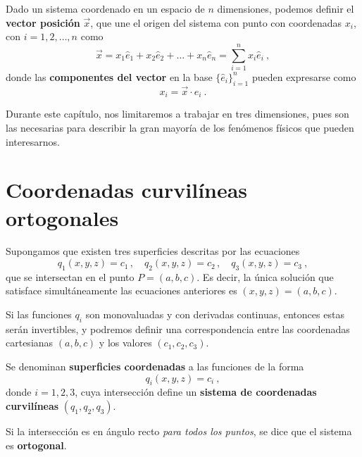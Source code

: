\begin{defi} 
    Dado un sistema coordenado en un espacio de $n$ dimensiones, podemos definir el \textbf{vector posición} $\vec{x}$, que une el origen del sistema con punto con coordenadas $x_i$, con $i = 1, 2, \dots, n$ como
\begin{equation} \label{eq:vector-posicion}
    \vec{x} = x_1 \hat{e}_1 + x_2 \hat{e}_2 + \dots + x_n \hat{e}_n = \sum_{i=1}^n x_i \hat{e}_i \ ,
\end{equation}
donde las \textbf{componentes del vector} en la base $\{ \hat{e}_i\}_{i=1}^n$ pueden expresarse como
\begin{equation}
    x_i = \vec{x} \cdot \hat{e}_i \ .
\end{equation}
\end{defi}

Durante este capítulo, nos limitaremos a trabajar en tres dimensiones, pues son las necesarias para describir la gran mayoría de los fenómenos físicos que pueden interesarnos.

\section{Coordenadas curvilíneas ortogonales}


Supongamos que existen tres superficies descritas por las ecuaciones
\begin{equation}
    q_1(x,y,z) = c_1 \, , \quad q_2(x,y,z) = c_2 \, , \quad q_3(x,y,z) = c_3 \ ,
\end{equation}
que se intersectan en el punto $P=(a,b,c)$. Es decir, la única solución que satisface simultáneamente las ecuaciones anteriores es $(x,y,z) = (a,b,c)$.

Si las funciones $q_i$ son monovaluadas y con derivadas continuas, entonces estas serán invertibles, y podremos definir una correspondencia entre las coordenadas cartesianas $(a,b,c)$ y los valores $(c_1,c_2,c_3)$.

\begin{defi}
    Se denominan \textbf{superficies coordenadas} a las funciones de la forma
    \begin{equation}
        q_i(x,y,z) = c_i \ ,
    \end{equation}
    donde $i = 1, 2, 3$, cuya intersección define un \textbf{sistema de coordenadas curvilíneas} $(q_1, q_2, q_3)$.
    

    Si la intersección es en ángulo recto \emph{para todos los puntos}, se dice que el sistema es \textbf{ortogonal}.
\end{defi}

